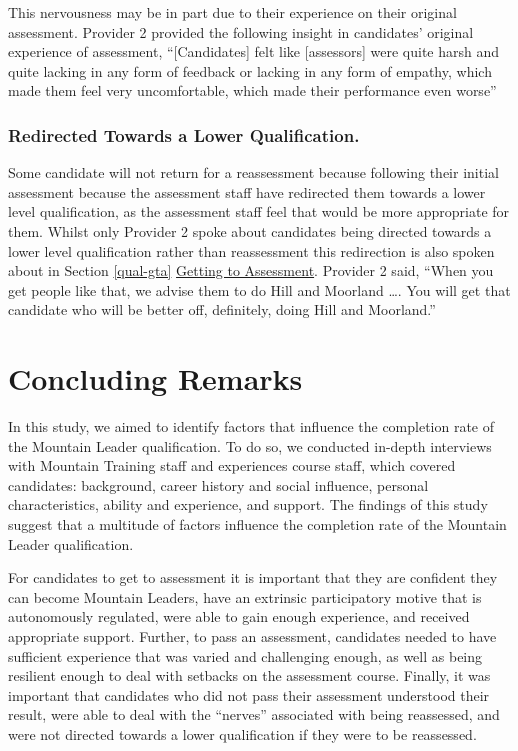 \documentclass[
  12pt,
  a4paper,
]{book}
\begin{document}
This nervousness may be in part due to their experience on their original assessment. Provider 2 provided the following insight in candidates' original experience of assessment, ``{[}Candidates{]} felt like {[}assessors{]} were quite harsh and quite lacking in any form of feedback or lacking in any form of empathy, which made them feel very uncomfortable, which made their performance even worse''

\hypertarget{redirected-towards-a-lower-qualification.}{%
\subsubsection{Redirected Towards a Lower Qualification.}\label{redirected-towards-a-lower-qualification.}}

Some candidate will not return for a reassessment because following their initial assessment because the assessment staff have redirected them towards a lower level qualification, as the assessment staff feel that would be more appropriate for them. Whilst only Provider 2 spoke about candidates being directed towards a lower level qualification rather than reassessment this redirection is also spoken about in Section \ref{qual-gta} \protect\hyperlink{qual-gta}{Getting to Assessment}. Provider 2 said, ``When you get people like that, we advise them to do Hill and Moorland \ldots. You will get that candidate who will be better off, definitely, doing Hill and Moorland.''

\hypertarget{concluding-remarks}{%
\section{Concluding Remarks}\label{concluding-remarks}}

In this study, we aimed to identify factors that influence the completion rate of the Mountain Leader qualification. To do so, we conducted in-depth interviews with Mountain Training staff and experiences course staff, which covered candidates: background, career history and social influence, personal characteristics, ability and experience, and support. The findings of this study suggest that a multitude of factors influence the completion rate of the Mountain Leader qualification.

For candidates to get to assessment it is important that they are confident they can become Mountain Leaders, have an extrinsic participatory motive that is autonomously regulated, were able to gain enough experience, and received appropriate support. Further, to pass an assessment, candidates needed to have sufficient experience that was varied and challenging enough, as well as being resilient enough to deal with setbacks on the assessment course. Finally, it was important that candidates who did not pass their assessment understood their result, were able to deal with the ``nerves'' associated with being reassessed, and were not directed towards a lower qualification if they were to be reassessed.
\end{document}
